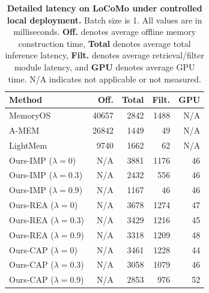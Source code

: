 \begin{table}[h]
    \centering
    \footnotesize
    \caption{\textbf{Detailed latency on LoCoMo under controlled local deployment.}
    Batch size is 1. All values are in milliseconds. 
    \textbf{Off.} denotes average offline memory construction time, 
    \textbf{Total} denotes average total inference latency, 
    \textbf{Filt.} denotes average retrieval/filter module latency, and 
    \textbf{GPU} denotes average GPU time. 
    N/A indicates not applicable or not measured.}
    \label{tab:latency_locomo_detail}
    \begin{tabular}{@{}lrrrr@{}}
        \toprule
        \textbf{Method} & \textbf{Off.} & \textbf{Total} & \textbf{Filt.} & \textbf{GPU} \\
        \midrule
        MemoryOS & 40657 & 2842 & 1488 & N/A \\
        A-MEM    & 26842 & 1449 & 49   & N/A \\
        LightMem & 9740  & 1662 & 62   & N/A \\
        \midrule
        Ours-IMP ($\lambda=0$)   & N/A & 3881 & 1176 & 46 \\
        Ours-IMP ($\lambda=0.3$) & N/A & 2432 & 556  & 46 \\
        Ours-IMP ($\lambda=0.9$) & N/A & 1167 & 46   & 46 \\
        \midrule
        Ours-REA ($\lambda=0$)   & N/A & 3678 & 1274 & 47 \\
        Ours-REA ($\lambda=0.3$) & N/A & 3429 & 1216 & 45 \\
        Ours-REA ($\lambda=0.9$) & N/A & 3318 & 1209 & 48 \\
        \midrule
        Ours-CAP ($\lambda=0$)   & N/A & 3461 & 1228 & 44 \\
        Ours-CAP ($\lambda=0.3$) & N/A & 3058 & 1079 & 46 \\
        Ours-CAP ($\lambda=0.9$) & N/A & 2853 & 976  & 52 \\
        \bottomrule
    \end{tabular}
\end{table}


